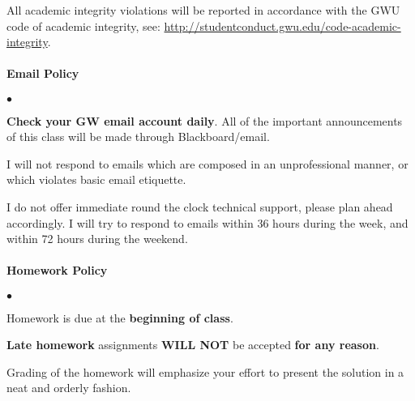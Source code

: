 \documentclass[10pt]{article}
\begin{document}
All academic integrity violations will be reported in accordance with the GWU code of academic integrity, see: \url{http://studentconduct.gwu.edu/code-academic-integrity}.


\paragraph*{Email Policy}

\begin{list}
{$\bullet$}
{\setlength{\itemsep}{-3pt}}

\item \textbf{Check your GW email account daily}. All of the important announcements of this class will be made through Blackboard/email. 

\item I will not respond to emails which are composed in an unprofessional manner, or which violates basic email etiquette. 

\item I do not offer immediate round the clock technical support, please plan ahead accordingly.
I will try to respond to emails within 36 hours during the week, and within 72 hours during the weekend.

\end{list}

\paragraph*{Homework Policy}

\begin{list}
{$\bullet$}
{\setlength{\itemsep}{-3pt}}

\item Homework is due at the \textbf{beginning of class}.

\item \textbf{Late homework} assignments \textbf{WILL NOT} be accepted \textbf{for any reason}.

\item Grading of the homework will emphasize your effort to present the solution in a neat and orderly fashion.


\end{list}
\end{document}
